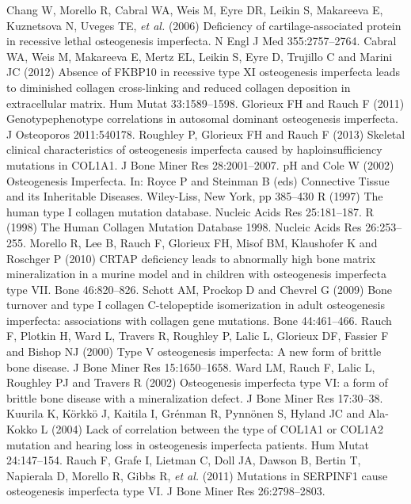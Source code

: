 \pagebreak\onecolumn
\begin{biblio}[References]
 Chang W, Morello R, Cabral WA, Weis M, Eyre DR, Leikin S, Makareeva E, Kuznetsova N, Uveges TE, \textit{et al.} (2006) Deficiency of cartilage-associated protein in recessive lethal osteogenesis imperfecta. N Engl J Med 355:2757–2764.
 Cabral WA, Weis M, Makareeva E, Mertz EL, Leikin S, Eyre D, Trujillo C and Marini JC (2012) Absence of FKBP10 in recessive type XI osteogenesis imperfecta leads to diminished collagen cross-linking and reduced collagen deposition in extracellular matrix. Hum Mutat 33:1589–1598.
 Glorieux FH and Rauch F (2011) Genotypephenotype correlations in autosomal dominant osteogenesis imperfecta. J Osteoporos 2011:540178.
 Roughley P, Glorieux FH and Rauch F (2013) Skeletal clinical characteristics of osteogenesis imperfecta caused by haploinsufficiency mutations in COL1A1. J Bone Miner Res 28:2001–2007.
pH and Cole W (2002) Osteogenesis Imperfecta. In: Royce P and Steinman B (eds) Connective Tissue and its Inheritable Diseases. Wiley-Liss, New York, pp 385–430
R (1997) The human type I collagen mutation database. Nucleic Acids Res 25:181–187.
R (1998) The Human Collagen Mutation Database 1998. Nucleic Acids Res 26:253–255.
 Morello R, Lee B, Rauch F, Glorieux FH, Misof BM, Klaushofer K and Roschger P (2010) CRTAP deficiency leads to abnormally high bone matrix mineralization in a murine model and in children with osteogenesis imperfecta type VII. Bone 46:820–826.
 Schott AM, Prockop D and Chevrel G (2009) Bone turnover and type I collagen C-telopeptide isomerization in adult osteogenesis imperfecta: associations with collagen gene mutations. Bone 44:461–466.
 Rauch F, Plotkin H, Ward L, Travers R, Roughley P, Lalic L, Glorieux DF, Fassier F and Bishop NJ (2000) Type V osteogenesis imperfecta: A new form of brittle bone disease. J Bone Miner Res 15:1650–1658.
 Ward LM, Rauch F, Lalic L, Roughley PJ and Travers R (2002) Osteogenesis imperfecta type VI: a form of brittle bone disease with a mineralization defect. J Bone Miner Res 17:30–38.
 Kuurila K, Körkkö J, Kaitila I, Grénman R, Pynnönen S, Hyland JC and Ala-Kokko L (2004) Lack of correlation between the type of COL1A1 or COL1A2 mutation and hearing loss in osteogenesis imperfecta patients. Hum Mutat 24:147–154.
 Rauch F, Grafe I, Lietman C, Doll JA, Dawson B, Bertin T, Napierala D, Morello R, Gibbs R, \textit{et al.} (2011) Mutations in SERPINF1 cause osteogenesis imperfecta type VI. J Bone Miner Res 26:2798–2803.

\end{biblio}
